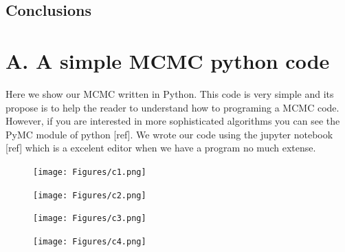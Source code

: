 \documentclass[onecolumn,           %
               showpacs,            %
               preprintnumbers,     %
               aps,                 %
               letterpaper,             %
               superscriptaddress,      %
               nofootinbib,         %
               tightenlines,        %
               floats,floatfix      %
               ,usenatbib,
               ]{revtex4-1}
\begin{document}
\subsection{Conclusions}
\appendix
\section{A. A simple MCMC python code}

Here we show our MCMC written in Python. This code is very simple and its propose is to help the reader to understand how to programing a MCMC code. However, if you are interested in more sophisticated algorithms you can see the PyMC module of python [ref]. We wrote our code using the jupyter notebook [ref] which is a excelent editor when we have a program no much extense.  

\begin{figure}[h!]
\texttt{[image: Figures/c1.png]}
\end{figure}
\begin{figure}[h!]
\texttt{[image: Figures/c2.png]}
\end{figure}
\begin{figure}[h!]
\texttt{[image: Figures/c3.png]}
\end{figure}
\begin{figure}[h!]
\texttt{[image: Figures/c4.png]}
\end{figure}
\end{document}
